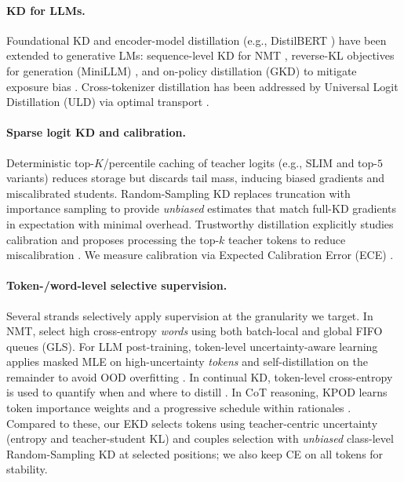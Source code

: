 \documentclass[11pt]{article}
\begin{document}
\paragraph{KD for LLMs.} Foundational KD \citep{hinton2015distillation} and encoder-model distillation (e.g., DistilBERT \citep{sanh2019distilbert}) have been extended to generative LMs: sequence-level KD for NMT \citep{kim2016sequencekd}, reverse-KL objectives for generation (MiniLLM) \citep{gu2023minillm}, and on-policy distillation (GKD) to mitigate exposure bias \citep{agarwal2024gkd}. Cross-tokenizer distillation has been addressed by Universal Logit Distillation (ULD) via optimal transport \citep{boizard2024uld}.

\paragraph{Sparse logit KD and calibration.} Deterministic top-$K$/percentile caching of teacher logits (e.g., SLIM \citep{raman2023slim} and top-$5$ variants) reduces storage but discards tail mass, inducing biased gradients and miscalibrated students. Random-Sampling KD \citep{anshumann2025sparse} replaces truncation with importance sampling to provide \emph{unbiased} estimates that match full-KD gradients in expectation with minimal overhead. Trustworthy distillation explicitly studies calibration and proposes processing the top-$k$ teacher tokens to reduce miscalibration \citep{shum2024first}. We measure calibration via Expected Calibration Error (ECE) \citep{guo2017calibration}.

\paragraph{Token-/word-level selective supervision.} Several strands selectively apply supervision at the granularity we target. In NMT, \citet{wang2021selectivekd} select high cross-entropy \emph{words} using both batch-local and global FIFO queues (GLS). For LLM post-training, token-level uncertainty-aware learning applies masked MLE on high-uncertainty \emph{tokens} and self-distillation on the remainder to avoid OOD overfitting \citep{liu2025tokenlevel}. In continual KD, token-level cross-entropy is used to quantify when and where to distill \citep{zhang2023continualkd}. In CoT reasoning, KPOD learns token importance weights and a progressive schedule within rationales \citep{feng2024kpod}. Compared to these, our EKD selects tokens using teacher-centric uncertainty (entropy and teacher-student KL) and couples selection with \emph{unbiased} class-level Random-Sampling KD at selected positions; we also keep CE on all tokens for stability.
\end{document}
